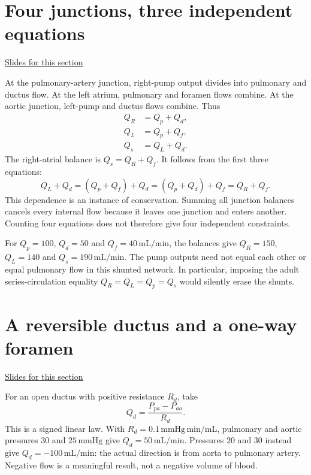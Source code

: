 \documentclass[11pt,letterpaper]{article}
\theoremstyle{definition}\newtheorem{definition}{Definition}\newtheorem{example}{Example}
\numberwithin{equation}{section}
\begin{document}
\section{Four junctions, three independent equations}
\hypertarget{note-four-junctions-three-independent-equations}{}\label{note:four-junctions-three-independent-equations}
{\small \href{slides.html\#frame=at-the-pulmonary-artery\&step=1}{Slides for this section}}\par
At the pulmonary-artery junction, right-pump output divides into pulmonary and ductus flow. At the left atrium, pulmonary and foramen flows combine. At the aortic junction, left-pump and ductus flows combine. Thus
\begin{align}
Q_R&=Q_p+Q_d,\label{eq:fetal-right}\\
Q_L&=Q_p+Q_f,\label{eq:fetal-left}\\
Q_s&=Q_L+Q_d.\label{eq:fetal-aorta}
\end{align}
The right-atrial balance is $Q_s=Q_R+Q_f$. It follows from the first three equations:
\[Q_L+Q_d=(Q_p+Q_f)+Q_d=(Q_p+Q_d)+Q_f=Q_R+Q_f.
\]
This dependence is an instance of conservation. Summing all junction balances cancels every internal flow because it leaves one junction and enters another. Counting four equations does not therefore give four independent constraints.

For $Q_p=100$, $Q_d=50$ and $Q_f=40\,\mathrm{mL/min}$, the balances give $Q_R=150$, $Q_L=140$ and $Q_s=190\,\mathrm{mL/min}$. The pump outputs need not equal each other or equal pulmonary flow in this shunted network. In particular, imposing the adult series-circulation equality $Q_R=Q_L=Q_p=Q_s$ would silently erase the shunts.
\section{A reversible ductus and a one-way foramen}
\hypertarget{note-a-reversible-ductus-and-a-one-way-foramen}{}\label{note:a-reversible-ductus-and-a-one-way-foramen}
{\small \href{slides.html\#frame=an-open-ductus-can-reverse-figure\&step=1}{Slides for this section}}\par
For an open ductus with positive resistance $R_d$, take
\begin{equation}Q_d=\frac{P_{pa}-P_{ao}}{R_d}.\end{equation}
This is a signed linear law. With $R_d=0.1\,\mathrm{mmHg\,min/mL}$, pulmonary and aortic pressures $30$ and $25\,\mathrm{mmHg}$ give $Q_d=50\,\mathrm{mL/min}$. Pressures $20$ and $30$ instead give $Q_d=-100\,\mathrm{mL/min}$: the actual direction is from aorta to pulmonary artery. Negative flow is a meaningful result, not a negative volume of blood.
\end{document}
